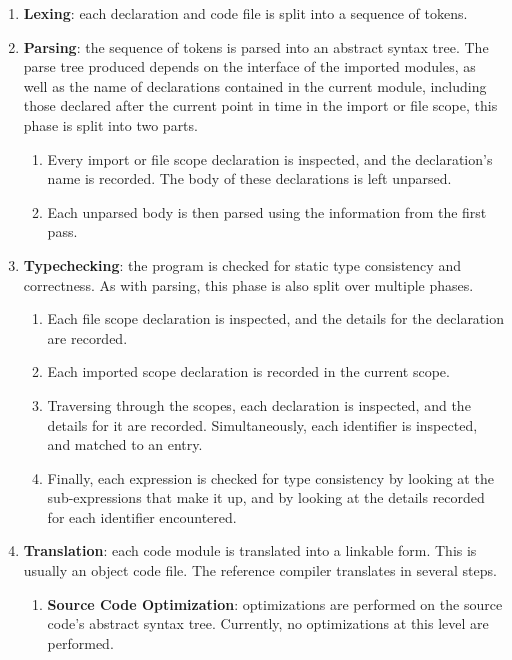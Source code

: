\documentclass[letterpaper,12pt]{book}
\begin{document}
\begin{enumerate}
	\item \textbf{Lexing}: each declaration and code file is split into a sequence of tokens.

	\item \textbf{Parsing}: the sequence of tokens is parsed into an abstract syntax tree. The parse tree produced depends on the interface of the imported modules, as well as the name of declarations contained in the current module, including those declared after the current point in time in the import or file scope, this phase is split into two parts.
	\begin{enumerate}
		\item Every import or file scope declaration is inspected, and the declaration's name is recorded. The body of these declarations is left unparsed.
		
		\item Each unparsed body is then parsed using the information from the first pass.
	\end{enumerate}

	\item \textbf{Typechecking}: the program is checked for static type consistency and correctness. As with parsing, this phase is also split over multiple phases.
	\begin{enumerate}
		\item Each file scope declaration is inspected, and the details for the declaration are recorded.
		
		\item Each imported scope declaration is recorded in the current scope.
		
		\item Traversing through the scopes, each declaration is inspected, and the details for it are recorded. Simultaneously, each identifier is inspected, and matched to an entry.
		
		\item Finally, each expression is checked for type consistency by looking at the sub-expressions that make it up, and by looking at the details recorded for each identifier encountered.
	\end{enumerate}
	
	\item \textbf{Translation}: each code module is translated into a linkable form. This is usually an object code file. The reference compiler translates in several steps.
	\begin{enumerate}
		\item \textbf{Source Code Optimization}: optimizations are performed on the source code's abstract syntax tree. Currently, no optimizations at this level are performed.
		

\end{enumerate}
\end{enumerate}
\end{document}
